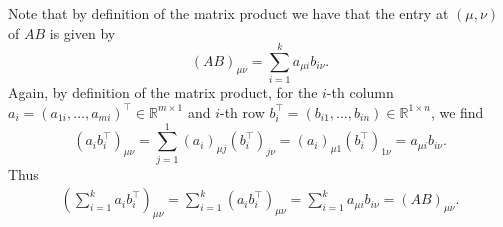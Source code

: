 {\color{solution}
Note that by definition of the matrix product we have that the entry at $(\mu,\nu)$ of $AB$ is given by
$$(AB)_{\mu \nu} = \sum_{i=1}^k a_{\mu i} b_{i\nu}. $$
Again, by definition of the matrix product, for the $i$-th column $a_i = (a_{1 i},\ldots,a_{mi})^\top \in \mathbb{R}^{m \times 1}$ and $i$-th row $b_i^\top = (b_{i1 },\ldots, b_{in })  \in \mathbb{R}^{1 \times n}$, we find
$$(a_ib_i^\top)_{\mu \nu} = \sum_{j=1}^1 (a_i)_{\mu j} (b_i^\top)_{j\nu}=(a_i)_{\mu 1} (b_i^\top)_{1\nu} = a_{\mu i}b_{i \nu}.$$
Thus 
\begin{align*}
\left(\sum_{i=1}^k a_i b_i^\top\right)_{\mu \nu}
 = \sum_{i=1}^k\left( a_i b_i^\top\right)_{\mu \nu} 
 = \sum_{i=1}^k a_{\mu i}b_{i \nu} = (AB)_{\mu \nu}.
\end{align*}

}
